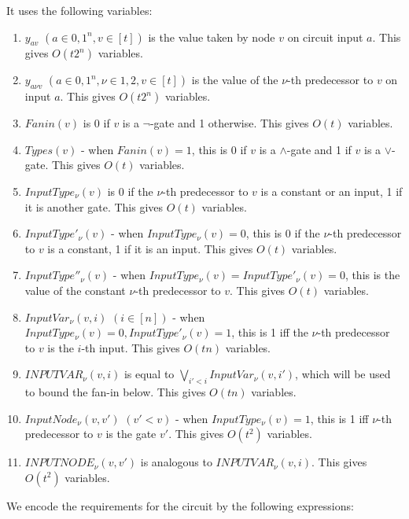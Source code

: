 \documentclass{article}
\begin{document}
It uses the following variables:

\begin{enumerate}

  \item $y_{av}$ $(a \in {0,1}^n, v \in [t])$ is the value taken by node $v$ on circuit input $a$. This gives $O(t2^n)$ variables.
  \item $y_{a\nu v}$ $(a \in {0,1}^n, \nu \in {1,2}, v \in [t])$ is the value of the $\nu$-th predecessor to $v$ on input $a$. This gives $O(t2^n)$ variables.
  \item $Fanin(v)$ is 0 if $v$ is a $\neg$-gate and 1 otherwise. This gives $O(t)$ variables.
  \item $Types(v)$ - when $Fanin(v)=1$, this is 0 if $v$ is a $\land$-gate and 1 if $v$ is a $\lor$-gate. This gives $O(t)$ variables.
  \item $InputType_\nu(v)$ is 0 if the $\nu$-th predecessor to $v$ is a constant or an input, 1 if it is another gate. This gives $O(t)$ variables.
  \item $InputType'_\nu(v)$ - when $InputType_{\nu}(v) = 0$, this is 0 if the $\nu$-th predecessor to $v$ is a constant, 1 if it is an input. This gives $O(t)$ variables.
  \item $InputType''_\nu(v)$ - when $InputType_{\nu}(v) = InputType'_{\nu}(v) = 0$, this is the value of the constant $\nu$-th predecessor to $v$. This gives $O(t)$ variables.
  \item $InputVar_\nu(v,i)$ $(i \in [n])$ - when $InputType_{\nu}(v) = 0, InputType'_{\nu}(v) = 1$, this is 1 iff the $\nu$-th predecessor to $v$ is the $i$-th input. This gives $O(tn)$ variables.
  \item $INPUTVAR_\nu(v,i)$ is equal to $\bigvee_{i'<i} InputVar_\nu(v,i')$, which will be used to bound the fan-in below. This gives $O(tn)$ variables.
  \item $InputNode_\nu(v,v')$ $(v' < v)$ - when $InputType_{\nu}(v) = 1$, this is 1 iff $\nu$-th predecessor to $v$ is the gate $v'$. This gives $O(t^2)$ variables.
  \item $INPUTNODE_\nu(v,v')$ is analogous to $INPUTVAR_\nu(v,i)$. This gives $O(t^2)$ variables.
  
\end{enumerate}

We encode the requirements for the circuit by the following expressions:
\end{document}
